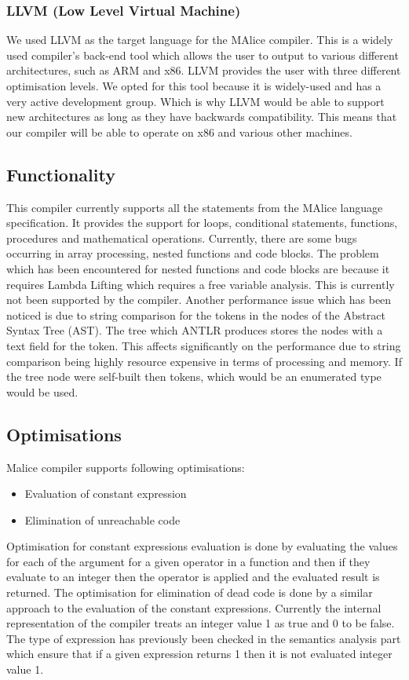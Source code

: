\documentclass[a4wide, 11pt]{article}
\begin{document}
		\subsubsection{LLVM (Low Level Virtual Machine)}
			We used LLVM as the target language for the MAlice compiler. This is a widely used compiler's back-end tool which
			allows the user to output to various different architectures, such as ARM and x86. LLVM provides the user
			with three different optimisation levels. We opted for this tool because
			it is widely-used and has a very active development group. Which is why LLVM would be able to support new architectures as long as they have backwards compatibility. This means that our compiler will be able to operate on x86 and various other machines.
		
	\subsection{Functionality}			
		This compiler currently supports all the statements from the MAlice language specification. It provides
		the support for loops, conditional statements, functions, procedures and mathematical operations. Currently, there are some bugs
		occurring in array processing, nested functions and code blocks. The problem which has been encountered for 
		nested functions and code blocks are because it requires Lambda Lifting which requires a free variable analysis. This is currently
		not been supported by the compiler. Another performance issue which has been noticed is due to string comparison for the tokens in
		the nodes of the Abstract Syntax Tree (AST). The tree which ANTLR produces stores the nodes with a text field for the token.
		This affects significantly on the performance due to string comparison being highly resource expensive in terms of processing and memory.
		If the tree node were self-built then tokens, which would be an enumerated type would be used.
	
	\subsection{Optimisations}
		Malice compiler supports following optimisations:
		\begin{itemize}
			\item Evaluation of constant expression
			\item Elimination of unreachable code
		\end{itemize} 
		Optimisation for constant expressions evaluation is done by evaluating the values for each of the argument for a given operator in a function
		and then if they evaluate to an integer then the operator is applied and the evaluated result is returned. The optimisation
		for elimination of dead code is done by a similar approach to the evaluation of the constant expressions. Currently 
		the internal representation of the compiler treats an integer value 1 as true and 0 to be false. The type of expression has
		previously been checked in the semantics analysis part which ensure that if a given expression returns 1 then it is not 
		evaluated integer value 1.
	
\end{document}
